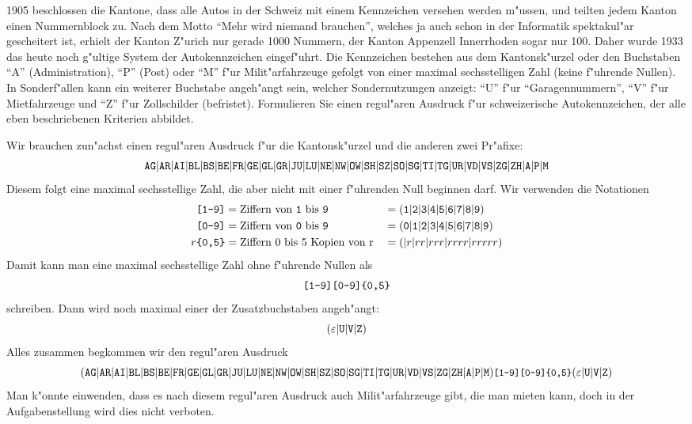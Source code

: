 1905 beschlossen die Kantone, dass alle Autos in der Schweiz mit einem
Kennzeichen versehen werden m"ussen, und teilten jedem Kanton einen
Nummernblock zu. Nach dem Motto ``Mehr wird niemand brauchen'', welches
ja auch schon in der Informatik spektakul"ar gescheitert ist, erhielt
der Kanton Z"urich nur gerade 1000 Nummern, der
Kanton Appenzell Innerrhoden sogar nur 100.
Daher wurde 1933 das heute noch g"ultige System der Autokennzeichen
eingef"uhrt. Die Kennzeichen bestehen aus dem Kantonsk"urzel
oder den Buchstaben ``A'' (Administration), ``P'' (Post) oder
``M'' f"ur Milit"arfahrzeuge gefolgt von einer maximal sechsstelligen Zahl
(keine f"uhrende Nullen).
In Sonderf"allen kann ein weiterer Buchstabe angeh"angt sein, welcher
Sondernutzungen anzeigt: ``U'' f"ur ``Garagennummern'',
``V'' f"ur Mietfahrzeuge und ``Z'' f"ur Zollschilder (befristet).
Formulieren Sie einen regul"aren Ausdruck f"ur schweizerische Autokennzeichen,
der alle eben beschriebenen Kriterien abbildet.

\begin{loesung}
Wir brauchen zun"achst einen regul"aren Ausdruck f"ur die Kantonsk"urzel
und die anderen zwei Pr"afixe:
\[
{\tt AG}|
{\tt AR}|
{\tt AI}|
{\tt BL}|
{\tt BS}|
{\tt BE}|
{\tt FR}|
{\tt GE}|
{\tt GL}|
{\tt GR}|
{\tt JU}|
{\tt LU}|
{\tt NE}|
{\tt NW}|
{\tt OW}|
{\tt SH}|
{\tt SZ}|
{\tt SO}|
{\tt SG}|
{\tt TI}|
{\tt TG}|
{\tt UR}|
{\tt VD}|
{\tt VS}|
{\tt ZG}|
{\tt ZH}|
{\tt A}|
{\tt P}|
{\tt M}
\]
Diesem folgt eine maximal sechsstellige Zahl, die aber nicht mit einer
f"uhrenden Null beginnen darf. Wir verwenden die Notationen
\begin{align*}
\text{\tt [1-9]}&=\text{Ziffern von {\tt 1} bis {\tt 9}}
&&=
({\tt 1}|
{\tt 2}|
{\tt 3}|
{\tt 4}|
{\tt 5}|
{\tt 6}|
{\tt 7}|
{\tt 8}|
{\tt 9})
\\
\text{\tt [0-9]}&=\text{Ziffern von {\tt 0} bis {\tt 9}}
&&=
({\tt 0}|
{\tt 1}|
{\tt 2}|
{\tt 3}|
{\tt 4}|
{\tt 5}|
{\tt 6}|
{\tt 7}|
{\tt 8}|
{\tt 9})
\\
r{\text{\tt \{0,5\}}}&=\text{Ziffern 0 bis 5 Kopien von r}
&&=(|r|rr|rrr|rrrr|rrrrr)
\end{align*}
Damit kann man eine maximal sechsstellige Zahl ohne f"uhrende Nullen als
\[
\text{\tt [1-9][0-9]\{0,5\}}
\]
schreiben.
Dann wird noch maximal einer der Zusatzbuchstaben angeh"angt:
\[
(\varepsilon|{\tt U}|{\tt V}|{\tt Z})
\]
Alles zusammen begkommen wir den regul"aren Ausdruck
\[
\small
(
{\tt AG}|
{\tt AR}|
{\tt AI}|
{\tt BL}|
{\tt BS}|
{\tt BE}|
{\tt FR}|
{\tt GE}|
{\tt GL}|
{\tt GR}|
{\tt JU}|
{\tt LU}|
{\tt NE}|
{\tt NW}|
{\tt OW}|
{\tt SH}|
{\tt SZ}|
{\tt SO}|
{\tt SG}|
{\tt TI}|
{\tt TG}|
{\tt UR}|
{\tt VD}|
{\tt VS}|
{\tt ZG}|
{\tt ZH}|
{\tt A}|
{\tt P}|
{\tt M})
\text{\tt [1-9][0-9]\{0,5\}}
(\varepsilon|{\tt U}|{\tt V}|{\tt Z})
\]
Man k"onnte einwenden, dass es nach diesem regul"aren Ausdruck auch
Milit"arfahrzeuge gibt, die man mieten kann, doch in der Aufgabenstellung
wird dies nicht verboten.
\end{loesung}

